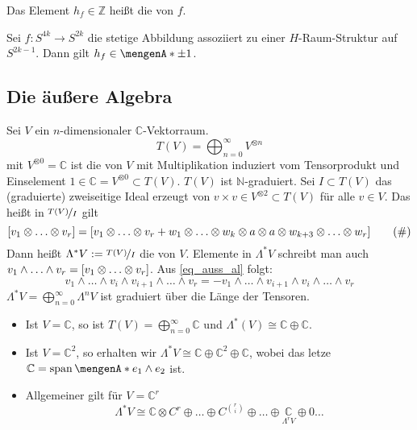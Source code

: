 \begin{definition}[label=sub:46,{name=[Hopf-Invariante]}]
Das Element $h_f \in \mathds{Z}$ heißt die  von $f$.
\end{definition}


\begin{satz}[label=sub:47]
	Sei $f\colon S^{4k} \to S^{2k}$ die stetige Abbildung assoziiert zu einer $H$-Raum-Struktur auf $S^{2k-1}$. Dann gilt $h_f \in \set{\pm 1}$.
\end{satz}
\begin{beweis}
\end{beweis}


\subsection*{Die äußere Algebra}
Sei $V$ ein $n$-dimensionaler $\mathds{C}$-Vektorraum.
\[
	T(V) = \bigoplus_{n=0}^\infty V^{\otimes n}
\]
mit $V^{\otimes 0}=\mathds{C}$ ist die  von $V$ mit Multiplikation induziert vom Tensorprodukt und Einselement 
$1\in \mathds{C}=V^{\otimes 0} \subset T(V)$. $T(V)$ ist $\mathds{N}$-graduiert. Sei $I \subset T(V)$ das (graduierte) zweiseitige Ideal erzeugt von 
$v \times v \in V^{\otimes 2} \subset T(V)$ für alle $v \in V$. Das heißt in $\nicefrac{T(V)}{I}$ gilt
\begin{equation*}
	\benbrace*{v_1 \otimes \ldots \otimes v_r} = \benbrace*{v_1 \otimes  \ldots \otimes v_r + w_1 \otimes  \ldots \otimes w_k \otimes a \otimes a \otimes w_{k+3} \otimes 
	\ldots \otimes w_r} \label{eq_auss_al} \tag{\#}
\end{equation*}
Dann heißt $\Lambda^* V:= \nicefrac{T(V)}{I}$ die  von $V$. Elemente in $\Lambda^*V$ schreibt man auch 
$v_1 \wedge \ldots \wedge v_r = \benbrace*{v_1 \otimes \ldots \otimes v_r}$. Aus \eqref{eq_auss_al} folgt: 
\[
	v_1 \wedge \ldots \wedge v_i \wedge v_{i+1} \wedge \ldots \wedge v_r = - v_1 \wedge \ldots \wedge v_{i+1} \wedge v_i \wedge \ldots \wedge v_r
\]
$\Lambda^* V = \bigoplus_{n=0}^\infty \Lambda^n V$ ist graduiert über die Länge der Tensoren.
\begin{beispiel}
\leavevmode
\begin{itemize}
	\item Ist $V=\mathds{C}$, so ist $T(V) = \bigoplus_{n=0}^\infty \mathds{C}$ und $\Lambda^*(V) \cong \mathds{C} \oplus \mathds{C}$.
	\item Ist $V=\mathds{C}^2$, so erhalten wir $\Lambda^* V \cong \mathds{C} \oplus \mathds{C}^2 \oplus \mathds{C}$, wobei das letze 
	$\mathds{C} = \Span \set{e_1 \wedge e_2} $ ist.
	\item Allgemeiner gilt für $V=\mathds{C}^r$
	\[
		\Lambda^* V \cong \mathds{C} \otimes C^r \oplus \ldots \oplus C^{\binom{r}{i}} \oplus \ldots \oplus \underset{\Lambda^r V}{\mathds{C}} \oplus 0 \ldots 
	\]
\end{itemize}
\end{beispiel}

